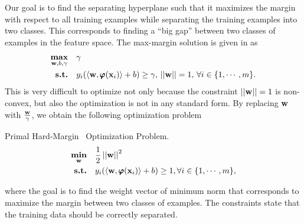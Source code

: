 {Our goal is to find the separating hyperplane such that it maximizes the margin with respect to all training examples while separating the training examples into two classes.
This corresponds to finding a ``big gap'' between two classes of examples in the feature space.
The max-margin solution is given in \citep{Bishop07} as
\begin{align*}
	\underset{\mathbf {w},b,\gamma}{\textbf{max}} &\quad \gamma\\
	\textbf{s.t.} &\quad y_i(\langle \mathbf {w}, \pmb \varphi(\mathbf {x}_i) \rangle+b) \ge \gamma, \, \left|\left| \mathbf {w} \right|\right|=1, \, \forall i\in\{1,\cdots,m\}.
\end{align*}
This is very difficult to optimize not only because the constraint $\left|\left| \mathbf {w} \right|\right|=1$ is non-convex, but also the optimization is not in any standard form.
By replacing $\mathbf {w}$ with $\frac{\mathbf {w}}{\gamma}$, we obtain the following optimization problem

\begin{definition}{Primal Hard-Margin \svm\ Optimization Problem.}\label{hardsvmprimal}
	\begin{align*}
		\underset{\mathbf {w}}{\textbf{min}} & \quad\frac{1}{2}\left|\left| \mathbf {w} \right|\right|^2\\
		\textbf{s.t.} & \quad y_i(\langle \mathbf {w}, \pmb \varphi(\mathbf {x}_i) \rangle + b) \ge 1, \forall i\in\{1,\cdots,m\},
	\end{align*}
\end{definition}
where the goal is to find the weight vector of minimum norm that corresponds to maximize the margin between two classes of examples.
The constraints state that the training data should be correctly separated.

}
